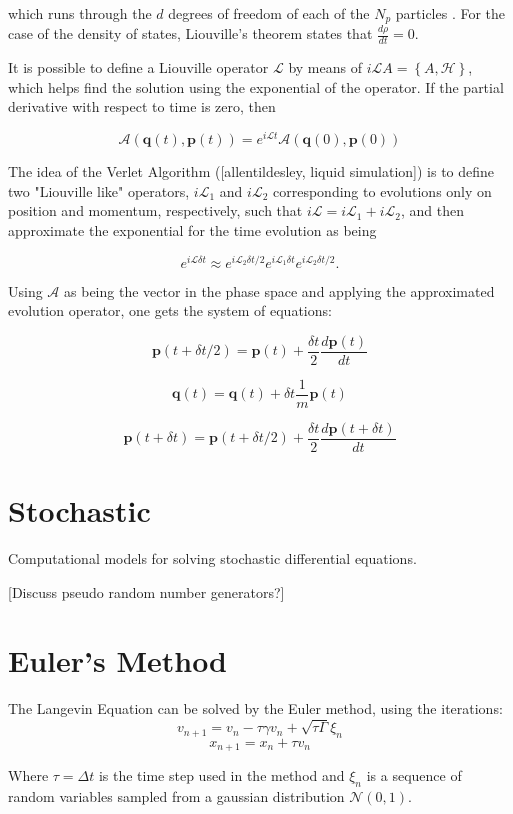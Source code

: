 which runs through the $d$ degrees of freedom of each of the $N_p$ particles \cite{salinasIntroducaoFisica2013}. For the case of the density of states, Liouville's theorem states that $\frac{d \rho}{dt} = 0$.

It is possible to define a Liouville operator $\mathcal{L}$ by means of $i\mathcal{L}A = \left\{A,\mathcal{H}\right\}$, which helps find the solution using the exponential of the operator. If the partial derivative with respect to time is zero, then

$$\mathcal{A}(\mathbf{q}(t), \mathbf{p}(t)) = e^{i\mathcal{L}t} \mathcal{A}(\mathbf{q}(0), \mathbf{p}(0))$$

The idea of the Verlet Algorithm ([allentildesley, liquid simulation]) is to define two "Liouville like" operators, $i\mathcal{L}_1$ and $i\mathcal{L}_2$ corresponding to evolutions only on position and momentum, respectively, such that $i\mathcal{L} = i\mathcal{L}_1 + i\mathcal{L}_2$, and then approximate the exponential for the time evolution as being

$$e^{i\mathcal{L}\delta t} \approx e^{i\mathcal{L}_2\delta t/2}e^{i\mathcal{L}_1\delta t}e^{i\mathcal{L}_2\delta t/2} .$$

Using $\mathcal{A}$ as being the vector in the phase space and applying the approximated evolution operator, one gets the system of equations:

$$\mathbf{p}(t+\delta t/2) = \mathbf{p}(t) + \frac{\delta t}{2}\frac{d \mathbf{p}(t)}{dt}$$

$$\mathbf{q}(t) = \mathbf{q}(t) + \delta t \frac{1}{m}\mathbf{p}(t)  $$

$$\mathbf{p}(t+\delta t) = \mathbf{p}(t+\delta t/2) + \frac{\delta t}{2}\frac{d \mathbf{p}(t+\delta t)}{dt}$$

\section{Stochastic}

Computational models for solving stochastic differential equations.

[Discuss pseudo random number generators?]

\section{Euler's Method} 

The Langevin Equation can be solved by the Euler method, using the iterations:
$$ v_{n+1} = v_{n} - \tau \gamma v_{n} + \sqrt{\tau\Gamma}\xi_{n} $$
$$ x_{n+1} = x_{n} + \tau v_{n}$$

Where $\tau = \Delta t$ is the time step used in the method and $\xi_{n}$ is a sequence of random variables sampled from a gaussian distribution $\mathcal{N}(0,1)$. 
